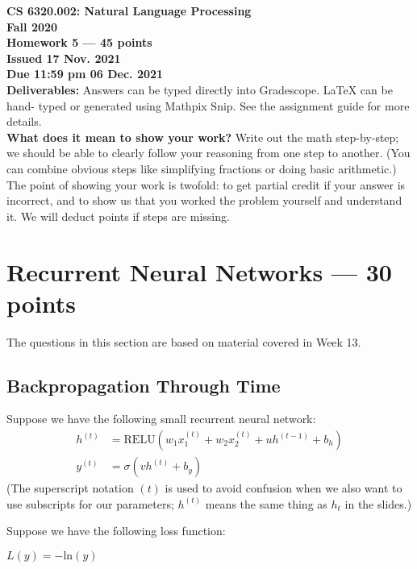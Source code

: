 \documentclass[12pt,a4paper]{article}
\begin{document}
\pagestyle{empty}

\textbf{CS 6320.002: Natural Language Processing} \\
\textbf{Fall 2020} \\

\textbf{Homework 5 --- 45 points} \\
\textbf{Issued 17 Nov. 2021} \\
\textbf{Due 11:59 pm 06 Dec. 2021} \\

\textbf{Deliverables:} Answers can be typed directly into Gradescope. LaTeX can be hand- typed or generated using Mathpix Snip. See the assignment guide for more details. \\

\textbf{What does it mean to show your work?} Write out the math step-by-step; we should be able to clearly follow your reasoning from one step to another. (You can combine obvious steps like simplifying fractions or doing basic arithmetic.) The point
 of showing your work is twofold: to get partial credit if your answer is incorrect, and to show us that you worked the problem yourself and understand it. We will deduct points if steps are missing. 

\section{Recurrent Neural Networks --- 30 points}

The questions in this section are based on material covered in Week 13.

\subsection{Backpropagation Through Time}

Suppose we have the following small recurrent neural network:
\begin{align*}
h^{(t)} &= \text{RELU}(w_1 x^{(t)}_1 + w_2x^{(t)}_2 + u h^{(t-1)} + b_h) \\ 
y^{(t)} &= \sigma (v h^{(t)} + b_y)
\end{align*}
(The superscript notation $(t)$ is used to avoid confusion when we also want to use subscripts for our parameters; $h^{(t)}$ means the same thing as $h_t$ in the slides.)

\vspace{.5\baselineskip}

Suppose we have the following loss function:
\begin{center}
$L(y) = - \text{ln}(y)$
\end{center}
\end{document}
